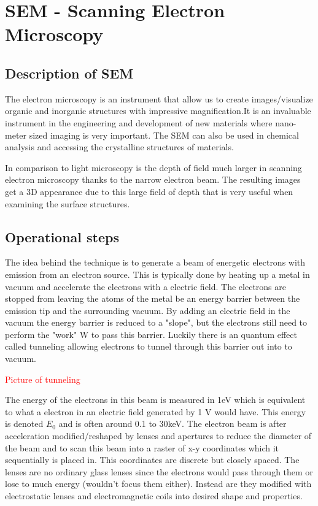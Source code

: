 \section{SEM - Scanning Electron Microscopy}

\subsection*{Description of SEM}
The electron microscopy is an instrument that allow us to create images/visualize organic and inorganic structures with impressive magnification.It is an invaluable instrument in the engineering and development of new materials where nano-meter sized imaging is very important. The SEM can also be used in chemical analysis and accessing the crystalline structures of materials.  


In comparison to light microscopy is the depth of field much larger in scanning electron microscopy thanks to the narrow electron beam. The resulting images get a 3D appearance due to this large field of depth that is very useful when examining the surface structures. 





\subsection*{Operational steps}
The idea behind the technique is to generate a beam of energetic electrons with emission from an electron source. This is typically done by heating up a metal in vacuum and accelerate the electrons with a electric field. The electrons are stopped from leaving the atoms of the metal be an energy barrier between the emission tip and the surrounding vacuum. By adding an electric field in the vacuum the energy barrier is reduced to a "slope", but the electrons still need to perform the "work" W to pass this barrier. Luckily there is an quantum effect called tunneling allowing electrons to tunnel through this barrier out into to vacuum.   

\textcolor{red}{Picture of tunneling} 

The energy of the electrons in this beam is measured in 1eV which is equivalent to what a electron in an electric field generated by 1 V would have. This energy is denoted $E_0$ and is often around 0.1 to 30keV. The electron beam is after acceleration modified/reshaped by lenses and apertures to reduce the diameter of the beam and to scan this beam into a raster of x-y coordinates which it sequentially is placed in. This coordinates are discrete but closely spaced. The lenses are no ordinary glass lenses since the electrons would pass through them or lose to much energy (wouldn't focus them either). Instead are they modified with electrostatic lenses and electromagnetic coils into desired shape and properties. 


